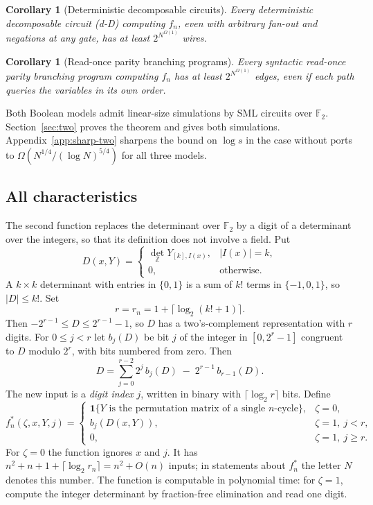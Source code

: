 \documentclass[11pt]{article}
\newtheorem{corollary}[theorem]{Corollary}
\theoremstyle{remark}
\newcommand{\F}{\mathbb F}
\newcommand{\Z}{\mathbb Z}
\newcommand{\one}{\mathbf 1}
\begin{document}
\begin{corollary}[Deterministic decomposable circuits]\label{cor:dd}
Every deterministic decomposable circuit (d-D) computing \(f_n\), even
with arbitrary fan-out and negations at any gate, has at least
\(2^{N^{\Omega(1)}}\) wires.
\end{corollary}

\begin{corollary}[Read-once parity branching programs]\label{cor:bp}
Every syntactic read-once parity branching program computing \(f_n\) has
at least \(2^{N^{\Omega(1)}}\) edges, even if each path queries the
variables in its own order.
\end{corollary}

Both Boolean models admit linear-size simulations by SML circuits over \(\F_2\).
Section~\ref{sec:two} proves the theorem and gives both simulations.
Appendix~\ref{app:sharp-two} sharpens the bound on \(\log s\) in the
case without ports to \(\Omega(N^{1/4}/(\log N)^{5/4})\) for all three models.

\subsection{All characteristics}\label{sec:function-all}
The second function replaces the determinant over \(\F_2\) by a digit of
a determinant over the integers, so that its definition does not involve
a field. Put
\[
 D(x,Y)=\begin{cases}\det_{\Z}Y_{[k],I(x)},&|I(x)|=k,\\
 0,&\text{otherwise.}\end{cases}
\]
A \(k\times k\) determinant with entries in \(\{0,1\}\) is a sum of
\(k!\) terms in \(\{-1,0,1\}\), so \(|D|\le k!\). Set
\[
 r=r_n=1+\lceil\log_2(k!+1)\rceil .
\]
Then \(-2^{r-1}\le D\le2^{r-1}-1\), so \(D\) has a two's-complement
representation with \(r\) digits. For \(0\le j<r\) let \(b_j(D)\) be bit
\(j\) of the integer in \([0,2^r-1]\) congruent to \(D\) modulo \(2^r\),
with bits numbered from zero. Then
\begin{equation}\label{eq:twos}
 D=\sum_{j=0}^{r-2}2^j\,b_j(D)\;-\;2^{r-1}\,b_{r-1}(D).
\end{equation}
The new input is a \emph{digit index} \(j\), written in binary with
\(\lceil\log_2r\rceil\) bits. Define
\[
 f^*_n(\zeta,x,Y,j)=
 \begin{cases}
 \one\{Y\text{ is the permutation matrix of a single }n\text{-cycle}\},
       &\zeta=0,\\
 b_j(D(x,Y)),&\zeta=1,\ j<r,\\
 0,&\zeta=1,\ j\ge r.
 \end{cases}
\]
For \(\zeta=0\) the function ignores \(x\) and \(j\). It has
\(n^2+n+1+\lceil\log_2r_n\rceil=n^2+O(n)\) inputs; in statements about
\(f^*_n\) the letter \(N\) denotes this number. The function is
computable in polynomial time: for \(\zeta=1\), compute the integer
determinant by fraction-free elimination and read one digit.
\end{document}
